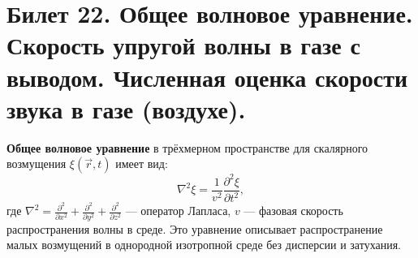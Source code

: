 \section{Билет 22. Общее волновое уравнение. Скорость упругой волны в газе с выводом. Численная оценка скорости звука в газе (воздухе).}

\begin{definition}
\textbf{Общее волновое уравнение} в трёхмерном пространстве для скалярного возмущения $\xi(\vec{r}, t)$ имеет вид:
\begin{equation}
    \nabla^2 \xi = \frac{1}{v^2} \frac{\partial^2 \xi}{\partial t^2}, \label{eq:general_wave}
\end{equation}
где $\nabla^2 = \frac{\partial^2}{\partial x^2} + \frac{\partial^2}{\partial y^2} + \frac{\partial^2}{\partial z^2}$ --- оператор Лапласа, $v$ --- фазовая скорость распространения волны в среде. Это уравнение описывает распространение малых возмущений в однородной изотропной среде без дисперсии и затухания.
\end{definition}

